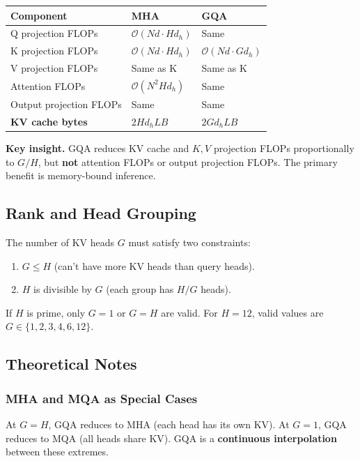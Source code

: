 \begin{table}[H]
\centering
\small
\begin{tabular}{lll}
\toprule
\textbf{Component} & \textbf{MHA} & \textbf{GQA} \\
\midrule
Q projection FLOPs & $\mathcal{O}(N d \cdot H d_h)$ & Same \\
K projection FLOPs & $\mathcal{O}(N d \cdot H d_h)$ & $\mathcal{O}(N d \cdot G d_h)$ \\
V projection FLOPs & Same as K & Same as K \\
Attention FLOPs & $\mathcal{O}(N^2 H d_h)$ & Same \\
Output projection FLOPs & Same & Same \\
\textbf{KV cache bytes} & $2 H d_h L B$ & $2 G d_h L B$ \\
\bottomrule
\end{tabular}
\end{table}

\textbf{Key insight.} GQA reduces KV cache and $K, V$ projection FLOPs proportionally 
to $G / H$, but \textbf{not} attention FLOPs or output projection FLOPs. The primary 
benefit is memory-bound inference.

\subsection{Rank and Head Grouping}

The number of KV heads $G$ must satisfy two constraints:

\begin{enumerate}
\item $G \le H$ (can't have more KV heads than query heads).
\item $H$ is divisible by $G$ (each group has $H / G$ heads).

\end{enumerate}
If $H$ is prime, only $G = 1$ or $G = H$ are valid. For $H = 12$, valid values 
are $G \in \{1, 2, 3, 4, 6, 12\}$.

\subsection{Theoretical Notes}

\subsubsection{MHA and MQA as Special Cases}

At $G = H$, GQA reduces to MHA (each head has its own KV). At $G = 1$, GQA 
reduces to MQA (all heads share KV). GQA is a \textbf{continuous interpolation} 
between these extremes.

